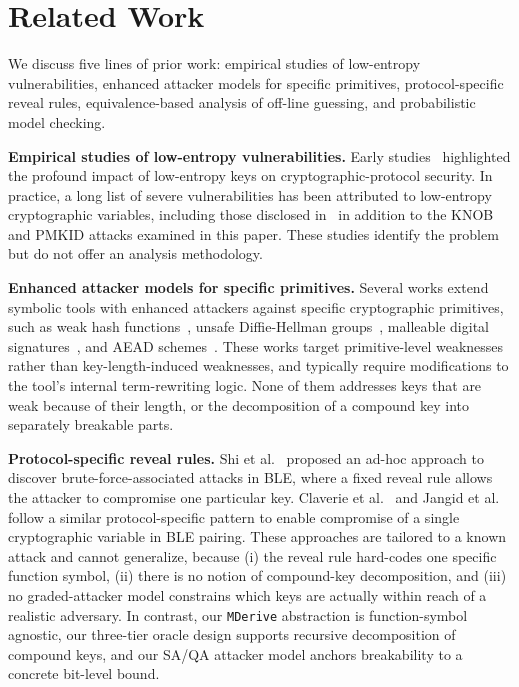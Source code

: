 \section{Related Work} \label{sec:7related-work}

We discuss five lines of prior work: empirical studies of low-entropy vulnerabilities, enhanced
attacker models for specific primitives, protocol-specific reveal rules, equivalence-based
analysis of off-line guessing, and probabilistic model checking.

\noindent\textbf{Empirical studies of low-entropy vulnerabilities.}
Early studies~\cite{gong1993protecting,kelsey1997secure} highlighted the profound impact of low-entropy keys on cryptographic-protocol security.
In practice, a long list of severe vulnerabilities has been attributed to low-entropy cryptographic variables, including those disclosed in~\cite{jangid2023bluepe,schneier1998cryptanalysis,ferguson1999cryptographic,gpgcracking} in addition to the KNOB and PMKID attacks examined in this paper.
These studies identify the problem but do not offer an analysis methodology.

\noindent\textbf{Enhanced attacker models for specific primitives.}
Several works extend symbolic tools with enhanced attackers against specific cryptographic primitives, such as weak hash functions~\cite{cheval2023hash}, unsafe Diffie-Hellman groups~\cite{cremers2019prime}, malleable digital signatures~\cite{jackson2019sign}, and AEAD schemes~\cite{cremers2023aead}.
These works target primitive-level weaknesses rather than key-length-induced weaknesses, and typically require modifications to the tool's internal term-rewriting logic.
None of them addresses keys that are weak because of their length, or the decomposition of a
compound key into separately breakable parts.

\noindent\textbf{Protocol-specific reveal rules.}
Shi et al.~\cite{shi2023blesc} proposed an ad-hoc approach to discover brute-force-associated attacks in BLE, where a fixed reveal rule allows the attacker to compromise one particular key.
Claverie et al.~\cite{claverie2023tamarin} and Jangid et al.~\cite{jangid2023bluepe} follow a similar protocol-specific pattern to enable compromise of a single cryptographic variable in BLE pairing.
These approaches are tailored to a known attack and cannot generalize, because (i) the reveal rule hard-codes one specific function symbol, (ii) there is no notion of compound-key decomposition, and (iii) no graded-attacker model constrains which keys are actually within reach of a realistic adversary.
In contrast, our \texttt{MDerive} abstraction is function-symbol agnostic, our three-tier oracle design supports recursive decomposition of compound keys, and our SA/QA attacker model anchors breakability to a concrete bit-level bound.

